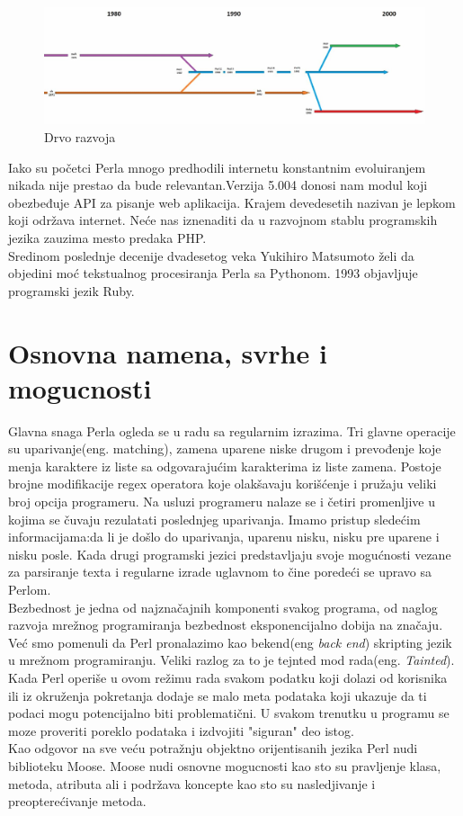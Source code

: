 \documentclass[a4paper]{article}
\begin{document}
\begin{figure}[H]
\centering
\includegraphics[scale=0.23]{drvorazvoja.jpg}
\caption{Drvo razvoja}
\end{figure}
Iako su početci Perla mnogo predhodili internetu konstantnim evoluiranjem nikada nije prestao da bude relevantan.Verzija 5.004 donosi nam modul koji obezbeđuje API za pisanje web aplikacija. Krajem devedesetih nazivan je lepkom koji održava internet. Neće nas iznenaditi da u razvojnom stablu programskih jezika zauzima mesto predaka PHP.\\
Sredinom poslednje decenije dvadesetog veka Yukihiro Matsumoto želi da objedini moć tekstualnog procesiranja Perla sa Pythonom. 1993 objavljuje programski jezik Ruby.



\section{Osnovna namena, svrhe i mogucnosti}
\label{sec:namena}

Glavna snaga Perla ogleda se u radu sa regularnim izrazima. Tri glavne operacije su uparivanje(eng. matching), zamena uparene niske drugom i prevođenje koje menja karaktere iz liste sa odgovarajućim karakterima iz liste zamena.\cite{id} Postoje brojne modifikacije regex operatora koje olakšavaju korišćenje i pružaju veliki broj opcija programeru. Na usluzi programeru nalaze se i četiri promenljive u kojima se čuvaju rezulatati poslednjeg uparivanja. Imamo pristup sledećim informacijama:da li je došlo do uparivanja, uparenu nisku, nisku pre uparene i nisku posle\cite{friedl2006mastering}. Kada drugi programski jezici predstavljaju svoje mogućnosti vezane za parsiranje texta i regularne izrade uglavnom to čine poredeći se upravo sa Perlom.\\
Bezbednost je jedna od najznačajnih komponenti svakog programa, od naglog razvoja mrežnog programiranja bezbednost eksponencijalno dobija na značaju. Već smo pomenuli da Perl pronalazimo kao bekend(eng {\em back end}) skripting jezik u mrežnom programiranju. Veliki razlog za to je tejnted mod rada(eng. {\em Tainted}). Kada Perl operiše u ovom režimu rada svakom podatku koji dolazi od korisnika ili iz okruženja pokretanja dodaje se malo meta podataka koji ukazuje da ti podaci mogu potencijalno biti problematični. U svakom trenutku u programu se moze proveriti poreklo podataka i izdvojiti "siguran" deo istog\cite{modern}.\\
Kao odgovor na sve veću potražnju objektno orijentisanih jezika Perl nudi biblioteku Moose. Moose nudi osnovne mogucnosti kao sto su pravljenje klasa, metoda, atributa ali i podržava koncepte kao sto su nasledjivanje i preopterećivanje metoda. 
\end{document}
